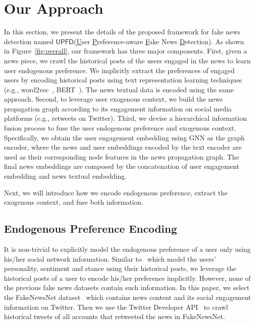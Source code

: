 \documentclass[sigconf]{acmart}
\newcommand\UPFD{$\mathsf{UPFD}$\xspace}
\begin{document}
 \section{Our Approach}
\label{sec02:method}
In this section, we present the details of the proposed framework for fake news detection named \UPFD (\underline{U}ser \underline{P}reference-aware \underline{F}ake News \underline{D}etection).
As shown in Figure~\ref{fig:overall}, our framework has three major components.
First, given a news piece, we crawl the historical posts of the users engaged in the news to learn user endogenous preference.
We implicitly extract the preferences of engaged users by encoding historical posts using text representation learning techniques (e.g., word2vec~\cite{mikolov2013efficient}, BERT~\cite{devlin2018bert}).
The news textual data is encoded using the same approach.
Second, to leverage user exogenous context, we build the news propagation graph according to its engagement information on social media platforms (e.g., retweets on Twitter).
Third, we devise a hierarchical information fusion process to fuse the user endogenous preference and exogenous context.
Specifically, we obtain the user engagement embedding using GNN as the graph encoder, where the news and user embeddings encoded by the text encoder are used as their corresponding node features in the news propagation graph.
The final news embeddings are composed by the concatenation of user engagement embedding and news textual embedding.

Next, we will introduce how we encode endogenous preference, extract the exogenous context, and fuse both information.

\subsection{Endogenous Preference Encoding}
\label{sec:text_encoding}

It is non-trivial to explicitly model the endogenous preference of a user only using his/her social network information.
Similar to~\cite{ahmad2017personality, khattri2015your, qian2018leveraging} which model the users' personality, sentiment and stance using their historical posts, we leverage the historical posts of a user to encode his/her preference implicitly.
However, none of the previous fake news datasets contain such information.
In this paper, we select the FakeNewsNet dataset~\cite{shu2018fakenewsnet} which contains news content and its social engagement information on Twitter.
Then we use the Twitter Developer API~\cite{twitterapi} to crawl historical tweets of all accounts that retweeted the news in FakeNewsNet.
\end{document}
